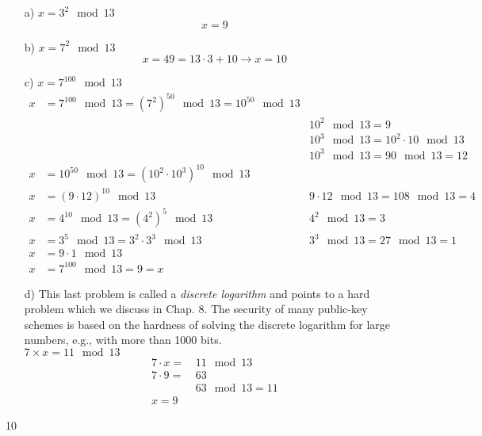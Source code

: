 \documentclass{article}
\begin{document}
\begin{enumerate}
  \setlength{\itemsep}{10pt}%
  \item[a)]  $x = 3^2 \mod 13$
  $$ \boxed{x = 9} $$

  \item[b)] $x = 7^2 \mod 13$
  $$ x = 49 = 13 \cdot 3 + 10 \rightarrow \boxed{x = 10}$$
  \item[c)] $x = 7^{100} \mod 13$
  \begin{align*}
  x &= 7^{100} \mod 13 = (7^2)^{50} \mod 13 = 10^{50} \mod 13 	& 												\\
  	&														  	& 10^2 \mod 13 = 9								\\
  	&							  	  						  	& 10^3 \mod 13 = 10^2 \cdot 10 \mod 13 			\\
  	&														  	& 10^3 \mod 13 = 90 \mod 13 = 12				\\
  x &= 10^{50} \mod 13 = (10^2 \cdot 10^3)^{10} \mod 13 		& 												\\
  x &= (9 \cdot 12)^{10} \mod 13								& 9 \cdot 12 \mod 13 = 108 \mod 13 = 4 			\\
  x &= 4^{10} \mod 13 = (4^2)^5 \mod 13						  	& 4^2 \mod 13 = 3 \\
  x &= 3^5 \mod 13 = 3^2 \cdot 3^3 \mod 13					  	& 3^3 \mod 13 = 27 \mod 13 = 1 					\\
  x &= 9 \cdot 1 \mod 13 									  	& 												\\
  x &= 7^{100} \mod 13 = \boxed{9 = x}							&									
  \end{align*}
  
  \newpage
  \item[d)] This last problem is called a \emph{discrete logarithm} and points to a hard problem which we discuss in Chap. 8. The security of many public-key schemes is based on the hardness of solving the discrete logarithm for large numbers, e.g., with more than 1000 bits.\\$7\times x = 11 \mod 13$
  \begin{align*}
  7 \cdot x = & \, 11 \mod 13 \\
  7 \cdot 9 = & \, 63 \\
  			  & \, 63 \mod 13 = 11 \\
  \boxed{x = 9} &
  \end{align*} 
\end{enumerate}

\setcounter{subsection} {10}
\end{document}
